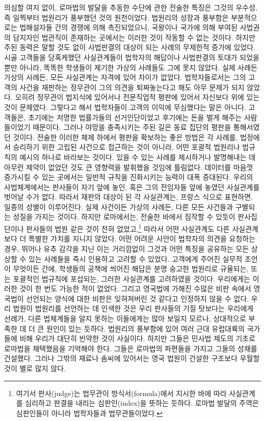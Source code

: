 의심할 여지 없이,
로마법의 발달을 추동한 수단에 관한 전술한 특징은
그것의 우수성, 즉 일찍부터 법원리가 풍부했던 것의 원천이었다.
법원리의 성장과 풍부함은 부분적으로는 법해설자들 간의 경쟁에 의해
촉진되었으니, 국왕이나 국가에 의해 부여된 사법권의 담지자인
법관직이 존재하는 곳에서는 이러한 것이 작동할 수 없는 것이다.
하지만 주된 동력은 말할 것도 없이 사법판결의 대상이 되는 사례의
무제한적 증가에 있었다.
시골 고객들을 당혹케했던 사실관계들이 법학자의 해답이나 사법판결의
토대가 되었을 뿐만 아니라, 똑똑한 학생들이 제기한 가상의 사례들도
그에 못지 않았다.
실제 사례든 가상의 사례든, 모든 사실관계는 자격에 있어 차이가 없었다.
법학자들로서는 그의 고객의 사건을 재판하는 정무관이 그의 의견을
퇴짜놓는다고 해도 아무 문제가 되지 않았다.
오히려 정무관이 법지식에 있어서나 전문직업적 평판에 있어서 자신보다
위에 있는 것이 문제였다.
그렇다고 해서 법학자들이 고객의 이익에 무심했다는 말은 아니다.
고객들은, 초기에는 저명한 법률가들의 선거인단이었고
후기에는 돈을 벌게 해주는 사람들이었기 때문이다.
그러나 야망을 충족시키는 주된 길은 동료 집단의 평판을 통해서였던 것이다.
전술한 이러한 체제 하에서 평판을 확보하는 좋은 방법은 각 사례를,
법정에서 승리하기 위한 고립된 사건으로 접근하는 것이 아니라,
어떤 포괄적 법원리나 법규칙의 예시의 하나로 바라보는 것이다.
있을 수 있는 사례를 제시하거나 발명해내는 데 아무런 제약이 없었던 것도
큰 영향력을 발휘했을 것임에 틀림없다.
데이터를 마음껏 증가시킬 수 있는 곳에서는
일반적 규칙을 진화시키는 능력이 대폭 증대된다.
우리의 사법체계에서는 판사들이 자기 앞에 놓인,
혹은 그의 전임자들 앞에 놓였던 사실관계를 벗어날 수가 없다.
따라서 재판의 대상이 된 각 사실관계는,
프랑스 식으로 표현하면, 일종의 성별이 이루어진다.
실제 사건이든 가상의 사례든, 다른 모든 사건들과 구별되는 성질을 가지는 것이다.
하지만 로마에서는, 전술한 바에서 짐작할 수 있듯이
판사집단이나 판사들의 법원
같은 것이 전혀 없었고,\footnote{%
  여기서 판사(judge)는
  법무관이 방식서(formula)에서 지시한 바에 따라
  사실관계를 심리하고 판결을 내리는
  심판인(iudex)을 뜻하는 듯하다.
  로마법 발달의 주역은 심판인들이 아니라 법학자들과 법무관들이었다. }
따라서 어떤 사실관계도 다른 사실관계보다 더 특별한 가치를 지니지 않았다.
어떤 어려운 사안이 법학자의 의견을 요청하는 경우,
뛰어나 유추 감각을 지닌 이는 거리낌없이 그것과 어떤 특징을 공유하는
모든 상상할 수 있는 사례들을 즉시 인용하고 고려할 수 있었다.
고객에게 주어진 실무적 조언이 무엇이든 간에,
학생들의 공책에 씌어진 해답은 분명
숭고한 법원리로 규율되는, 또는 포괄적인 법규칙에 포섭되는,
그러한 사실관계를 고려하였을 것이다.
우리에게는 이러한 것이 한 번도 가능한 적이 없었다.
그리고 영국법에 가해진 수많은 비판 속에서
영국법이 선언되는 양식에 대한 비판은 잊혀져버린 것 같다고 인정하지 않을 수 없다.
우리 법원이 법원리를 선언하는 데 인색한 것은
우리 판사들의 기질 탓보다는
우리에게 선례가,
다른 법체계들을 알지 못하는 이들에게는 많아 보일지 모르나,
상대적으로 부족한 데 더 큰 원인이 있는 듯하다.
법원리의 풍부함에 있어 여러 근대 유럽대륙의 국가들에 비해
우리가 대단히 빈약한 것이 사실이다.
하지만 그들은 민사법 제도의 기초로 로마법을 채택했음을 기억해야 한다.
그들은 로마법의 파편들을 가지고 그들의 성채를 건설했다.
그러나 그밖의 재료나 솜씨에 있어서는 영국 법원이 건설한 구조보다
우월할 것이 별로 많지 않다.


